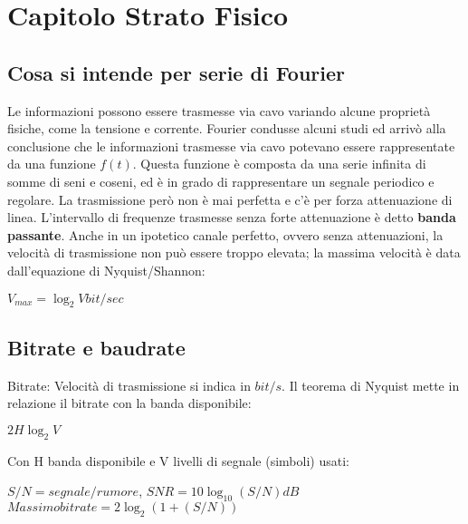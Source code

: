 \section{Capitolo Strato Fisico}

\subsection{Cosa si intende per serie di Fourier}

Le informazioni possono essere trasmesse via cavo variando alcune proprietà fisiche, come la
tensione e corrente. Fourier condusse alcuni studi ed arrivò alla conclusione che le informazioni
trasmesse via cavo potevano essere rappresentate da una funzione $f(t)$. Questa funzione è
composta da una serie infinita di somme di seni e coseni, ed è in grado di rappresentare un segnale
periodico e regolare. La trasmissione però non è mai perfetta e c'è per forza attenuazione di linea.
L'intervallo di frequenze trasmesse senza forte attenuazione è detto \textbf{banda passante}.
Anche in un ipotetico canale perfetto, ovvero senza attenuazioni, la velocità di trasmissione non
può essere troppo elevata; la massima velocità è data dall'equazione di Nyquist/Shannon:

\begin{center}

$V_{max} = \log_{2} V  bit/sec$

\end{center}

\subsection{Bitrate e baudrate}

Bitrate: Velocità di trasmissione si indica in $bit/s$. Il teorema di Nyquist mette in relazione il bitrate con la banda disponibile:

\begin{center}

	$2H\log_2V$

\end{center}

Con H banda disponibile e V livelli di segnale (simboli) usati:

\begin{center}

	$S/N = segnale/rumore$,  $SNR = 10\log_{10} (S/N) dB$
	\newline
	$Massimo bitrate = 2\log_2 (1+(S/N))$

\end{center}	


